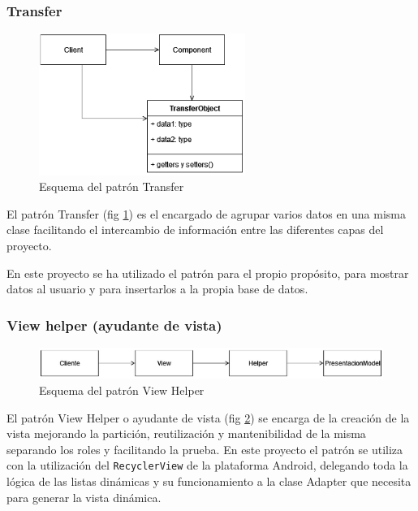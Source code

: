 \subsubsection{\textbf{Transfer}}
\begin{figure}[H]
    \centering
    \includegraphics[width=0.6\textwidth]{Images/Capitulo6/transfer.png}
    \caption{Esquema del patrón Transfer}
    \label{fig:transfer}
\end{figure}
El patrón Transfer (fig \ref{fig:transfer}) es el encargado de agrupar varios datos en una misma clase facilitando el intercambio de información entre las diferentes capas del proyecto.

En este proyecto se ha utilizado el patrón para el propio propósito, para mostrar datos al usuario y para insertarlos a la propia base de datos.

\subsubsection{\textbf{View helper (ayudante de vista)}}
\begin{figure}[H]
    \centering
    \includegraphics[width=\textwidth]{Images/Capitulo6/view.png}
    \caption{Esquema del patrón View Helper}
    \label{fig:view}
\end{figure}
El patrón View Helper o ayudante de vista (fig \ref{fig:view}) se encarga de la creación de la vista mejorando la partición, reutilización y mantenibilidad de la misma separando los roles y facilitando la prueba.
En este proyecto el patrón se utiliza con la utilización del \texttt{RecyclerView} de la plataforma Android, delegando toda la lógica de las listas dinámicas y su funcionamiento a la clase Adapter que necesita para generar la vista dinámica.